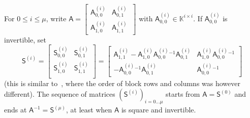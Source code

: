 \documentclass[sigconf]{acmart}
\newcommand{\mA}{\ensuremath{\mathsf{A}}}
\newcommand{\mI}{\ensuremath{\mathsf{I}}}
\newcommand{\mP}{\ensuremath{\mathsf{P}}}
\newcommand{\mR}{\ensuremath{\mathsf{R}}}
\newcommand{\mS}{\ensuremath{\mathsf{S}}}
\newcommand{\K}{\ensuremath{\mathbb{K}}}
\newcommand{\mn}{\ensuremath{\mu}}
\theoremstyle{acmdefinition}
\begin{document}
For $0\leq i \leq \mn$, write
$ \mA=\left [\begin{smallmatrix}
    \mA^{(i)}_{0,0} & \mA^{(i)}_{0,1}\ \\[1mm]
    \mA^{(i)}_{1,0} & \mA^{(i)}_{1,1}\
  \end{smallmatrix} \right]$
with $\mA^{(i)}_{0,0} \in \K^{i \times i}$.  If ${\mA^{(i)}_{0,0}}$ is
invertible, set
$$
\mS^{(i)} = 
\begin{bmatrix} 
     \mS^{(i)}_{0,0} & \mS^{(i)}_{0,1}\\
     \mS^{(i)}_{1,0} & \mS^{(i)}_{1,1}\\
\end{bmatrix} = 
\begin{bmatrix} 
  \mA^{(i)}_{1,1} - \mA^{(i)}_{1,0} {\mA^{(i)}_{0,0}}{}^{-1} \mA^{(i)}_{0,1} 
  & 
  \mA^{(i)}_{1,0} {\mA^{(i)}_{0,0}}{}^{-1} 
  \\[1mm]
  -{\mA^{(i)}_{0,0}}{}^{-1} \mA^{(i)}_{0,1}
  &  
  {\mA^{(i)}_{0,0}}{}^{-1} 
\end{bmatrix}
$$
(this 
is similar to~\cite{Cardinal99}, where
the order of block rows and columns was however different). The sequence of
matrices $( \mS^{(i)})_{i=0\dots \mn}$  starts from $\mA=\mS^{(0)}$ and ends at
$\mA^{-1}=\mS^{(\mn)}$, at least when $\mA$ is square and invertible. 

\end{document}

